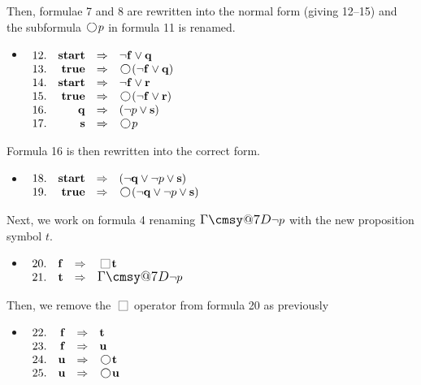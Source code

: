 \documentclass[nohyperref]{acmtrans2f}
\makeatletter
\def\sometime{\mathord{\hbox{\large$\mathchar"0\cmsy@7D$}}}
\newcommand{\always}{\raisebox{-.2ex}{
                           \mbox{\unitlength=0.9ex
                           \begin{picture}(2,2)
                           \linethickness{0.06ex}
                           \put(0,0){\line(1,0){2}}
                           \put(0,2){\line(1,0){2}}
                           \put(0,0){\line(0,1){2}}
                           \put(2,0){\line(0,1){2}}
                           \end{picture}}}
                          \,}
\newcommand{\next}{\!\raisebox{-.2ex}{ %
                        \mbox{\unitlength=0.9ex
                        \begin{picture}(2,2)
                        \linethickness{0.06ex}
                        \put(1,1){\circle{2}} %
                        \end{picture}}}       %
                        \,}
\let\imp=\Rightarrow
\def\ltrue{\hbox{\rm\bf true}}
\def\lstart{\hbox{\rm\bf start}}
\makeatother
\begin{document}
Then, formulae 7 and 8 are rewritten into the normal form (giving 12--15)
and the subformula $\next p$ in formula 11 is renamed.
\begin{itemize}
\item[] $\begin{array}[t]{rrcl}
12. & \lstart & \imp & \neg {\bf f} \lor {\bf q} \\
13. & \ltrue & \imp & \next(\neg {\bf f} \lor {\bf q}) \\
14. & \lstart & \imp & \neg {\bf f} \lor {\bf r} \\
15. & \ltrue & \imp & \next(\neg {\bf f} \lor {\bf r}) \\
16. & {\bf q} & \imp & (\neg p \lor {\bf s}) \\
17. & {\bf s} & \imp & \next p \\
\end{array}$
\end{itemize}
Formula 16 is then rewritten into the correct form.
\begin{itemize}
\item[] $\begin{array}[t]{rrcl}
18. & \lstart & \imp & (\neg {\bf q} \lor \neg p \lor {\bf s}) \\
19. & \ltrue & \imp & \next (\neg {\bf q} \lor \neg p \lor {\bf s}) \\
\end{array}$
\end{itemize}
Next, we work on formula 4 renaming $\sometime \neg p$ with the new
proposition symbol $t$.
\begin{itemize}
\item[] $\begin{array}[t]{rrcl}
20. & {\bf f} & \imp  & \always {\bf t} \\
21. & {\bf t} & \imp & \sometime \neg p \\
\end{array}$
\end{itemize}
Then, we remove the $\always$ operator from formula 20 as previously
\begin{itemize}
\item[] $\begin{array}[t]{rrcl}
22. & {\bf f} & \imp &  {\bf t} \\
23. &   {\bf f} & \imp & {\bf u} \\
24. &    {\bf u} & \imp & \next {\bf t} \\
25. &    {\bf u} & \imp & \next {\bf u} \\
\end{array}$
\end{itemize}
\end{document}
